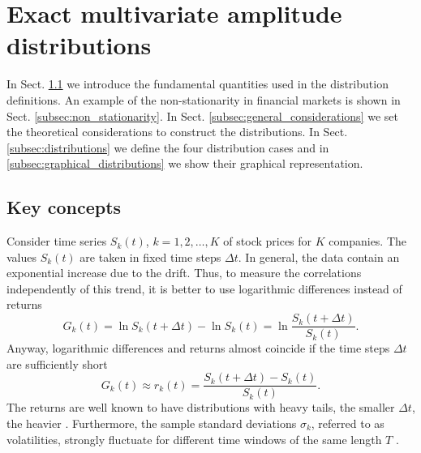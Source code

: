 \section{Exact multivariate amplitude distributions}
\label{sec:exact_distributions}

In Sect. \ref{subsec:key_concepts} we introduce the fundamental quantities used
in the distribution definitions. An example of the non-stationarity in
financial markets is shown in Sect. \ref{subsec:non_stationarity}. In Sect.
\ref{subsec:general_considerations} we set the theoretical considerations to
construct the distributions. In Sect.  \ref{subsec:distributions} we define the
four distribution cases and in \ref{subsec:graphical_distributions} we show
their graphical representation.

\subsection{Key concepts}\label{subsec:key_concepts}

Consider time series $S_{k} \left( t \right)$, $k = 1, 2, \ldots, K$ of stock
prices for $K$ companies. The values $S_{k} \left( t \right)$ are taken in
fixed time steps $\Delta t$. In general, the data contain an exponential
increase due to the drift. Thus, to measure the correlations independently of
this trend, it is better to use logarithmic differences instead of returns
\begin{equation}
    G_{k} \left( t \right) = \ln S_{k} \left( t + \Delta t \right) -
    \ln S_{k} \left(t \right) = \ln \frac{S_{k} \left( t + \Delta t \right)}
    {S_{k} \left(t \right)}.
\end{equation}
Anyway, logarithmic differences and returns almost coincide if the time steps
$\Delta t$ are sufficiently short \cite{subtle_nature,empirical_facts}
\begin{equation}
    G_{k} \left(t\right) \approx r_{k} \left(t\right)
    = \frac{S_{k} \left( t + \Delta t \right) - S_{k} \left( t \right)}
    {S_{k} \left( t \right)}.
\end{equation}
The returns are well known to have distributions with heavy tails, the smaller
$\Delta t$, the heavier
\cite{non_stationarity_fin_guhr}. Furthermore, the sample standard deviations
$\sigma_{k}$, referred to as volatilities, strongly fluctuate for different
time windows of the same length $T$
\cite{non_stationarity_fin_guhr,volatility_change}.

